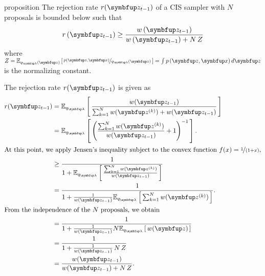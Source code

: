 
\begin{theoremEnd}[]{proposition}\label{thm:cis_bound}
  The rejection rate \(r(\vz_{t-1})\) of a CIS sampler with \(N\) proposals is bounded below such that
  \[
  r\,(\vz_{t-1}) \geq \frac{w\,(\vz_{t-1})}{w\,(\vz_{t-1}) + N\,Z}
  \]
  where \(Z=\Esub{q_{\vlambda}(\vz)}{\nicefrac{p(\vz,\vx)}{q_{\vlambda}(\vz)}} = \int p\,(\vz,\vx)\,d\vz\) is the normalizing constant.
\end{theoremEnd}
\begin{proofEnd}
  The rejection rate \(r(\vz_{t-1})\) is given as
  \begin{align}
    r(\vz_{t-1})
    &= \Esub{q_{\vlambda}}{ \frac{w(\vz_{t-1})}{ \sum^{N}_{k=1} w(\vz^{(k)}) + w(\vz_{t-1})} } \\
    &= \Esub{q_{\vlambda}}{ {\left( \frac{\sum^{N}_{k=1} w(\vz^{(k)}) }{ w(\vz_{t-1}) } + 1 \right)}^{-1} }.  \\
\intertext{At this point, we apply Jensen's inequality subject to the convex function \(f(x) = \nicefrac{1}{(1 + x)}\),}
    &\geq \frac{1}{1 + \Esub{q_{\vlambda}}{ \frac{\sum^{N}_{k=1} w(\vz^{(k)})}{w(\vz_{t-1})} } } \\
    &=    \frac{1}{1 + \frac{1}{w(\vz_{t-1})} \Esub{q_{\vlambda}}{ \sum^{N}_{k=1} w(\vz^{(k)}) } }. \\
\intertext{From the independence of the \(N\) proposals, we obtain}
    &=    \frac{1}{1 + \frac{1}{w(\vz_{t-1})} N \Esub{q_{\vlambda}}{ w(\vz) } } \\
    &=    \frac{1}{1 + \frac{1}{w(\vz_{t-1})}\,N\,Z } \\
    &=    \frac{w(\vz_{t-1})}{w(\vz_{t-1}) + N\,Z}.
  \end{align}
\end{proofEnd}

